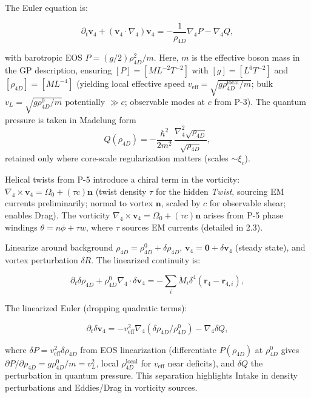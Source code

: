The Euler equation is:

\begin{equation}
\partial_t \mathbf{v}_4 + (\mathbf{v}_4 \cdot \nabla_4) \mathbf{v}_4 = -\frac{1}{\rho_{4D}} \nabla_4 P - \nabla_4 Q,
\end{equation}

with barotropic EOS $P = (g/2) \rho_{4D}^2 / m$. Here, $m$ is the effective boson mass in the GP description, ensuring $[P] = [M L^{-2} T^{-2}]$ with $[g] = [L^6 T^{-2}]$ and $[\rho_{4D}] = [M L^{-4}]$ (yielding local effective speed $v_{\text{eff}} = \sqrt{g \rho_{4D}^{\text{local}} / m}$; bulk $v_L = \sqrt{g \rho_{4D}^0 / m}$ potentially $\gg c$; observable modes at $c$ from P-3). The quantum pressure is taken in Madelung form
\[
Q(\rho_{4D})=-\frac{\hbar^2}{2m^2}\,\frac{\nabla_4^2\sqrt{\rho_{4D}}}{\sqrt{\rho_{4D}}},
\]
retained only where core-scale regularization matters (scales $\sim\xi_c$).

Helical twists from P-5 introduce a chiral term in the vorticity: $\nabla_4 \times \mathbf{v}_4 = \Omega_0 + (\tau c) \mathbf{n}$ (twist density $\tau$ for the hidden \emph{Twist}, sourcing EM currents preliminarily; normal to vortex $\mathbf{n}$, scaled by $c$ for observable shear; enables Drag). The vorticity $\nabla_4 \times \mathbf{v}_4 = \Omega_0 + (\tau c) \mathbf{n}$ arises from P-5 phase windings $\theta = n\phi + \tau w$, where $\tau$ sources EM currents (detailed in 2.3).

Linearize around background $\rho_{4D} = \rho_{4D}^0 + \delta \rho_{4D}$, $\mathbf{v}_4 = \mathbf{0} + \delta \mathbf{v}_4$ (steady state), and vortex perturbation $\delta R$. The linearized continuity is:

\begin{equation}
\partial_t \delta \rho_{4D} + \rho_{4D}^0 \nabla_4 \cdot \delta \mathbf{v}_4 = -\sum_i \dot{M}_i \delta^4(\mathbf{r}_4 - \mathbf{r}_{4,i}),
\end{equation}

The linearized Euler (dropping quadratic terms):

\begin{equation}
\partial_t \delta \mathbf{v}_4 = -v_{\text{eff}}^2 \nabla_4 (\delta \rho_{4D} / \rho_{4D}^0) - \nabla_4 \delta Q,
\end{equation}

where $\delta P = v_{\text{eff}}^2 \delta \rho_{4D}$ from EOS linearization (differentiate $P(\rho_{4D})$ at $\rho_{4D}^0$ gives $\partial P / \partial \rho_{4D} = g \rho_{4D}^0 / m = v_L^2$, local $\rho_{4D}^{\text{local}}$ for $v_{\text{eff}}$ near deficits), and $\delta Q$ the perturbation in quantum pressure. This separation highlights Intake in density perturbations and Eddies/Drag in vorticity sources.

